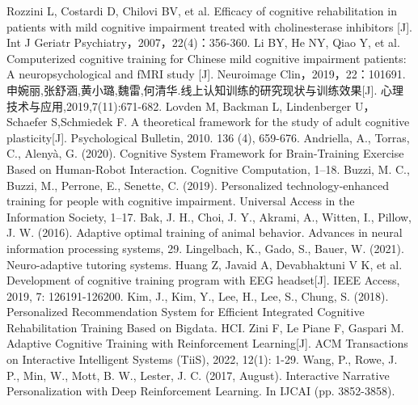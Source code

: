 \documentclass{article}
\begin{document}
    
    \begin{thebibliography}{99}  

        Rozzini L, Costardi D, Chilovi BV, et al. Efficacy of cognitive rehabilitation in patients with mild cognitive impairment treated with cholinesterase inhibitors [J]. Int J Geriatr Psychiatry，2007，22(4)：356-360.
        Li BY, He NY, Qiao Y, et al. Computerized cognitive training for Chinese mild cognitive impairment patients: A neuropsychological and fMRI study [J]. Neuroimage Clin，2019，22：101691.
        申婉丽,张舒涵,黄小璐,魏雷,何清华.线上认知训练的研究现状与训练效果[J]. 心理技术与应用,2019,7(11):671-682.
        Lovden M, Backman L, Lindenberger U，Schaefer S,Schmiedek F. A theoretical framework for the study of adult cognitive plasticity[J]. Psychological Bulletin, 2010. 136 (4), 659-676.
        Andriella, A., Torras, C.,  Alenyà, G. (2020). Cognitive System Framework for Brain-Training Exercise Based on Human-Robot Interaction. Cognitive Computation, 1–18.
        Buzzi, M. C., Buzzi, M., Perrone, E., Senette, C. (2019). Personalized technology-enhanced training for people with cognitive impairment. Universal Access in the Information Society, 1–17. 
        Bak, J. H., Choi, J. Y., Akrami, A., Witten, I.,  Pillow, J. W. (2016). Adaptive optimal training of animal behavior. Advances in neural information processing systems, 29.
        Lingelbach, K., Gado, S.,  Bauer, W. (2021). Neuro-adaptive tutoring systems. 
        Huang Z, Javaid A, Devabhaktuni V K, et al. Development of cognitive training program with EEG headset[J]. IEEE Access, 2019, 7: 126191-126200.
        Kim, J., Kim, Y., Lee, H., Lee, S.,  Chung, S. (2018). Personalized Recommendation System for Efficient Integrated Cognitive Rehabilitation Training Based on Bigdata. HCI.
        Zini F, Le Piane F, Gaspari M. Adaptive Cognitive Training with Reinforcement Learning[J]. ACM Transactions on Interactive Intelligent Systems (TiiS), 2022, 12(1): 1-29.
        Wang, P., Rowe, J. P., Min, W., Mott, B. W.,  Lester, J. C. (2017, August). Interactive Narrative Personalization with Deep Reinforcement Learning. In IJCAI (pp. 3852-3858).
        \end{thebibliography}
\end{document}
